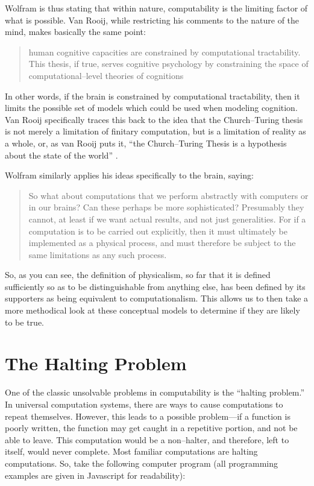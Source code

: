 Wolfram is thus stating that within nature, computability is the limiting factor of what is possible.  Van Rooij, while restricting his comments to the nature of the mind, makes basically the same point:

\begin{quote}
human cognitive capacities are constrained by computational tractability.  This thesis, if true, serves cognitive psychology by constraining the space of computational--level theories of cognitions \citep{vanrooij2008}
\end{quote}

In other words, if the brain is constrained by computational tractability, then it limits the possible set of models which could be used when modeling cognition.  Van Rooij specifically traces this back to the idea that the Church--Turing thesis is not merely a limitation of finitary computation, but is a limitation of reality as a whole, or, as van Rooij puts it, ``the Church--Turing Thesis is a hypothesis about the state of the world'' \citep{vanrooij2008}.

Wolfram similarly applies his ideas specifically to the brain, saying:

\begin{quote}
So what about computations that we perform abstractly with computers or in our brains?  Can these perhaps be more sophisticated?  Presumably they cannot, at least if we want  actual results, and not just generalities.  For if a computation is to be carried out explicitly, then it must ultimately be implemented as a physical process, and must therefore be subject to the same limitations as any such process. \citep[][pg. 721]{wolfram2002}
\end{quote}

So, as you can see, the definition of physicalism, so far that it is defined sufficiently so as to be distinguishable from anything else, has been defined by its supporters as being equivalent to computationalism.  This allows us to then take a more methodical look at these conceptual models to determine if they are likely to be true.

\section{The Halting Problem}

One of the classic unsolvable problems in computability is the ``halting problem.''  In universal computation systems, there are ways to cause computations to repeat themselves.  However, this leads to a possible problem---if a function is poorly written, the function may get caught in a repetitive portion, and not be able to leave.  This computation would be a non--halter, and therefore, left to itself, would never complete.  Most familiar computations are halting computations.  So, take the following computer program (all programming examples are given in Javascript for readability):

